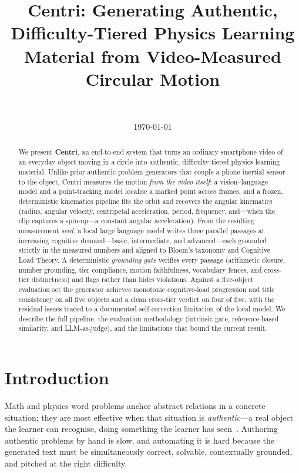 \documentclass[11pt]{article}
\title{\textbf{Centri: Generating Authentic, Difficulty-Tiered Physics
Learning Material from Video-Measured Circular Motion}}
\author{\todo{authors} \\ \small \todo{affiliation --- Hwang Lab}}
\date{\today}
\begin{document}
\maketitle

\begin{abstract}
We present \textbf{Centri}, an end-to-end system that turns an ordinary
smartphone video of an everyday object moving in a circle into authentic,
difficulty-tiered physics learning material. Unlike prior authentic-problem
generators that couple a phone inertial sensor to the object, Centri measures
the motion \emph{from the video itself}: a vision--language model and a
point-tracking model localise a marked point across frames, and a frozen,
deterministic kinematics pipeline fits the orbit and recovers the angular
kinematics (radius, angular velocity, centripetal acceleration, period,
frequency, and---when the clip captures a spin-up---a constant angular
acceleration). From the resulting measurement \emph{seed}, a local large
language model writes three parallel passages at increasing cognitive
demand---basic, intermediate, and advanced---each grounded strictly in the
measured numbers and aligned to Bloom's taxonomy and Cognitive Load Theory. A
deterministic \emph{grounding gate} verifies every passage (arithmetic
closure, number grounding, tier compliance, motion faithfulness, vocabulary
fences, and cross-tier distinctness) and flags rather than hides violations.
Against a five-object evaluation set the generator achieves monotonic
cognitive-load progression and title consistency on all five objects and a
clean cross-tier verdict on four of five, with the residual issues traced to a
documented self-correction limitation of the local model. We describe the full
pipeline, the evaluation methodology (intrinsic gate, reference-based
similarity, and LLM-as-judge), and the limitations that bound the current
result.
\end{abstract}

\section{Introduction}
Math and physics word problems anchor abstract relations in a concrete
situation; they are most effective when that situation is \emph{authentic}---a
real object the learner can recognise, doing something the learner has
seen~\cite{placeholder}. Authoring authentic problems by hand is slow, and
automating it is hard because the generated text must be simultaneously
correct, solvable, contextually grounded, and pitched at the right difficulty.
\end{document}
